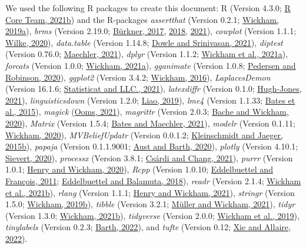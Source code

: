 \documentclass[utf8]{frontiers_suppmat} %
\begin{document}
We used the following R packages to create this document: R (Version 4.3.0; \protect\hyperlink{ref-R-base}{R Core Team, 2021b}) and the R-packages \emph{assertthat} (Version 0.2.1; \protect\hyperlink{ref-R-assertthat}{Wickham, 2019a}), \emph{brms} (Version 2.19.0; \protect\hyperlink{ref-R-brms_a}{Bürkner, 2017}, \protect\hyperlink{ref-R-brms_b}{2018}, \protect\hyperlink{ref-R-brms_c}{2021}), \emph{cowplot} (Version 1.1.1; \protect\hyperlink{ref-R-cowplot}{Wilke, 2020}), \emph{data.table} (Version 1.14.8; \protect\hyperlink{ref-R-data.table}{Dowle and Srinivasan, 2021}), \emph{diptest} (Version 0.76.0; \protect\hyperlink{ref-R-diptest}{Maechler, 2021}), \emph{dplyr} (Version 1.1.2; \protect\hyperlink{ref-R-dplyr}{Wickham et al., 2021a}), \emph{forcats} (Version 1.0.0; \protect\hyperlink{ref-R-forcats}{Wickham, 2021a}), \emph{gganimate} (Version 1.0.8; \protect\hyperlink{ref-R-gganimate}{Pedersen and Robinson, 2020}), \emph{ggplot2} (Version 3.4.2; \protect\hyperlink{ref-R-ggplot2}{Wickham, 2016}), \emph{LaplacesDemon} (Version 16.1.6; \protect\hyperlink{ref-R-LaplacesDemon}{Statisticat and LLC., 2021}), \emph{latexdiffr} (Version 0.1.0; \protect\hyperlink{ref-R-latexdiffr}{Hugh-Jones, 2021}), \emph{linguisticsdown} (Version 1.2.0; \protect\hyperlink{ref-R-linguisticsdown}{Liao, 2019}), \emph{lme4} (Version 1.1.33; \protect\hyperlink{ref-R-lme4}{Bates et al., 2015}), \emph{magick} (\protect\hyperlink{ref-R-magick}{Ooms, 2021}), \emph{magrittr} (Version 2.0.3; \protect\hyperlink{ref-R-magrittr}{Bache and Wickham, 2020}), \emph{Matrix} (Version 1.5.4; \protect\hyperlink{ref-R-Matrix}{Bates and Maechler, 2021}), \emph{modelr} (Version 0.1.11; \protect\hyperlink{ref-R-modelr}{Wickham, 2020}), \emph{MVBeliefUpdatr} (Version 0.0.1.2; \protect\hyperlink{ref-R-MVBeliefUpdatr}{Kleinschmidt and Jaeger, 2015b}), \emph{papaja} (Version 0.1.1.9001; \protect\hyperlink{ref-R-papaja}{Aust and Barth, 2020}), \emph{plotly} (Version 4.10.1; \protect\hyperlink{ref-R-plotly}{Sievert, 2020}), \emph{processx} (Version 3.8.1; \protect\hyperlink{ref-R-processx}{Csárdi and Chang, 2021}), \emph{purrr} (Version 1.0.1; \protect\hyperlink{ref-R-purrr}{Henry and Wickham, 2020}), \emph{Rcpp} (Version 1.0.10; \protect\hyperlink{ref-R-Rcpp_a}{Eddelbuettel and François, 2011}; \protect\hyperlink{ref-R-Rcpp_b}{Eddelbuettel and Balamuta, 2018}), \emph{readr} (Version 2.1.4; \protect\hyperlink{ref-R-readr}{Wickham et al., 2021b}), \emph{rlang} (Version 1.1.1; \protect\hyperlink{ref-R-rlang}{Henry and Wickham, 2021}), \emph{stringr} (Version 1.5.0; \protect\hyperlink{ref-R-stringr}{Wickham, 2019b}), \emph{tibble} (Version 3.2.1; \protect\hyperlink{ref-R-tibble}{Müller and Wickham, 2021}), \emph{tidyr} (Version 1.3.0; \protect\hyperlink{ref-R-tidyr}{Wickham, 2021b}), \emph{tidyverse} (Version 2.0.0; \protect\hyperlink{ref-R-tidyverse}{Wickham et al., 2019}), \emph{tinylabels} (Version 0.2.3; \protect\hyperlink{ref-R-tinylabels}{Barth, 2022}), and \emph{tufte} (Version 0.12; \protect\hyperlink{ref-R-tufte}{Xie and Allaire, 2022}).
\end{document}
